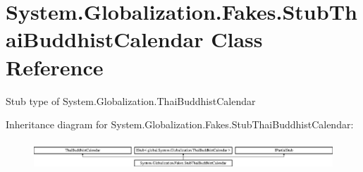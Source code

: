 \hypertarget{class_system_1_1_globalization_1_1_fakes_1_1_stub_thai_buddhist_calendar}{\section{System.\-Globalization.\-Fakes.\-Stub\-Thai\-Buddhist\-Calendar Class Reference}
\label{class_system_1_1_globalization_1_1_fakes_1_1_stub_thai_buddhist_calendar}
}


Stub type of System.\-Globalization.\-Thai\-Buddhist\-Calendar 


Inheritance diagram for System.\-Globalization.\-Fakes.\-Stub\-Thai\-Buddhist\-Calendar\-:\begin{figure}[H]
\begin{center}
\leavevmode
\includegraphics[height=1.054614cm]{class_system_1_1_globalization_1_1_fakes_1_1_stub_thai_buddhist_calendar}
\end{center}
\end{figure}
